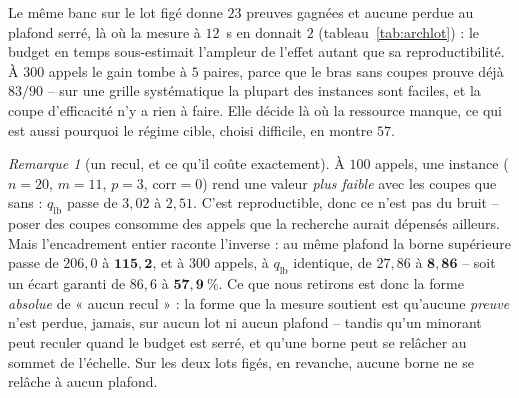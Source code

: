 \documentclass[11pt,a4paper]{article}
\theoremstyle{plain}
\theoremstyle{remark}
\newtheorem{remark}{Remarque}
\begin{document}
\noindent
Le même banc sur le lot figé donne $23$ preuves gagnées et aucune perdue au
plafond serré, là où la mesure à $12$~s en donnait $2$
(tableau~\ref{tab:archlot}) : le budget en temps sous-estimait l'ampleur de
l'effet autant que sa reproductibilité. À $300$ appels le gain tombe à $5$
paires, parce que le bras sans coupes prouve déjà $83/90$ -- sur une grille
systématique la plupart des instances sont faciles, et la coupe
d'efficacité n'y a rien à faire. Elle décide là où la ressource manque,
ce qui est aussi pourquoi le régime cible, choisi difficile, en montre $57$.

\begin{remark}[un recul, et ce qu'il coûte exactement]
\label{rem:recullot}
À $100$ appels, une instance ($n=20$, $m=11$, $p=3$, $\text{corr}=0$) rend
une valeur \emph{plus faible} avec les coupes que sans : $q_{\text{lb}}$
passe de $3{,}02$ à $2{,}51$. C'est reproductible, donc ce n'est pas du
bruit -- poser des coupes consomme des appels que la recherche aurait
dépensés ailleurs. Mais l'encadrement entier raconte l'inverse : au même
plafond la borne supérieure passe de $206{,}0$ à $\mathbf{115{,}2}$, et à
$300$ appels, à $q_{\text{lb}}$ identique, de $27{,}86$ à $\mathbf{8{,}86}$
-- soit un écart garanti de $86{,}6$ à $\mathbf{57{,}9\ \%}$. Ce que nous
retirons est donc la forme \emph{absolue} de « aucun recul » : la forme que
la mesure soutient est qu'aucune \emph{preuve} n'est perdue, jamais, sur
aucun lot ni aucun plafond -- tandis qu'un minorant peut reculer quand le
budget est serré, et qu'une borne peut se relâcher au sommet de l'échelle.
Sur les deux lots figés, en revanche, aucune borne ne se relâche à aucun
plafond.
\end{remark}
\end{document}

